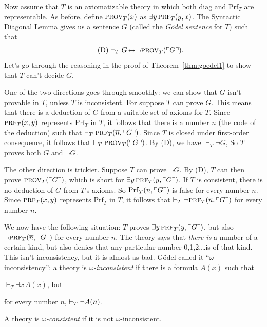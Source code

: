 Now assume that $T$ is an axiomatizable theory in which
both $\mathrm{diag}$ and $\mathrm{Prf}_T$ are representable.
As before,
define $\smallcaps{Prov}_T(x)$ as $\exists y \, \smallcaps{Prf}_T(y,x)$.
The Syntactic Diagonal Lemma gives us a sentence $G$
(called the \emph{Gödel sentence} for $T$) such that
\begin{equation}\tag{D}
  \proves_T G \leftrightarrow \neg \smallcaps{Prov}_T(\gn{G}).
\end{equation}
Let's go through the reasoning in the proof of Theorem~\ref{thm:goedel1}
to show that $T$ can't decide $G$.

One of the two directions goes through smoothly:
we can show that $G$ isn't provable in $T$,
unless $T$ is inconsistent.
For suppose $T$ can prove $G$.
This means that there is a deduction of $G$ from a suitable set of axioms for $T$.
Since $\smallcaps{Prf}_T(x,y)$ represents $\mathrm{Prf}_T$ in $T$,
it follows that there is a number $n$ (the code of the deduction) such that
$\vdash_T \smallcaps{Prf}_T(\num{n},\gn{G})$.
Since $T$ is closed under first-order consequence,
it follows that $\vdash_T \smallcaps{Prov}_T(\gn{G})$.
By (D), we have $\vdash_T \neg G$,
So $T$ proves both $G$ and $\neg G$.

The other direction is trickier.
Suppose $T$ can prove $\neg G$.
By (D), $T$ can then prove $\smallcaps{Prov}_T(\gn{G})$,
which is short for $\exists y \, \smallcaps{Prf}_T(y,\gn{G})$.
If $T$ is consistent,
there is no deduction of $G$ from $T$'s axioms.
So $\mathrm{Prf}_T(n,\ulcorner G \urcorner)$ is false for every number $n$.
Since $\smallcaps{Prf}_T(x,y)$ represents $\mathrm{Prf}_T$ in $T$,
it follows that $\proves_T \neg \smallcaps{Prf}_T(\num{n},\gn{G})$ for every number $n$.

We now have the following situation:
$T$ proves $\exists y \, \smallcaps{Prf}_T(y,\gn{G})$,
but also $\neg \smallcaps{Prf}_T(\num{n},\gn{G})$ for every number $n$.
The theory says that \emph{there is} a number of a certain kind,
but also denies that any particular number 0,1,2,\ldots is of that kind.
This isn't inconsistency,
but it is almost as bad.
Gödel called it ``$\omega$-inconsistency'':
a theory is \emph{$\omega$-inconsistent} if
there is a formula $A(x)$ such that
\begin{cenumerate}
    \item[(i)] $\vdash_T \exists x \, A(x)$, but
    \item[(ii)] for every number $n$, $\vdash_T \neg A(\overline{n})$.
\end{cenumerate}
A theory is \emph{$\omega$-consistent} if it is not $\omega$-inconsistent.

